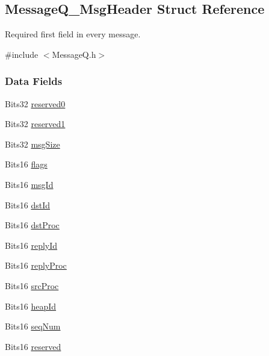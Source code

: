 \subsection{MessageQ\_\-MsgHeader Struct Reference}
\label{struct_message_q___msg_header}


Required first field in every message.  




{\ttfamily \#include $<$MessageQ.h$>$}

\subsubsection*{Data Fields}
\begin{DoxyCompactItemize}
\item 
Bits32 \hyperlink{struct_message_q___msg_header_aa8269e435d09e486b167c0b6f9cc90b0}{reserved0}
\item 
Bits32 \hyperlink{struct_message_q___msg_header_a1e12c3020f3f175128bf2ae4c5d1df7c}{reserved1}
\item 
Bits32 \hyperlink{struct_message_q___msg_header_adee0e6ed997b218584e2009854fa5214}{msgSize}
\item 
Bits16 \hyperlink{struct_message_q___msg_header_a377485e7c13fde415d7d8811fe8f4f37}{flags}
\item 
Bits16 \hyperlink{struct_message_q___msg_header_abb97c08bbc06479c4a5e5fde91412e57}{msgId}
\item 
Bits16 \hyperlink{struct_message_q___msg_header_af37bb45f1801bf39207a7293bf5a05d3}{dstId}
\item 
Bits16 \hyperlink{struct_message_q___msg_header_a6a4fcb509b74acd7d45f23a55c71d552}{dstProc}
\item 
Bits16 \hyperlink{struct_message_q___msg_header_ac933455354a8b5735404cbc81147dd06}{replyId}
\item 
Bits16 \hyperlink{struct_message_q___msg_header_a9c6cbc63347f25ea6cc47338d570cb48}{replyProc}
\item 
Bits16 \hyperlink{struct_message_q___msg_header_a29c80efb7f32089965ce1a0e69b7262c}{srcProc}
\item 
Bits16 \hyperlink{struct_message_q___msg_header_a4281bf0f37f64a9c5e580f0abc3536eb}{heapId}
\item 
Bits16 \hyperlink{struct_message_q___msg_header_afcef65b2eebc0e508363870743706909}{seqNum}
\item 
Bits16 \hyperlink{struct_message_q___msg_header_a66d4a1e8d4a20da8bad4feca1c710e53}{reserved}
\end{DoxyCompactItemize}


